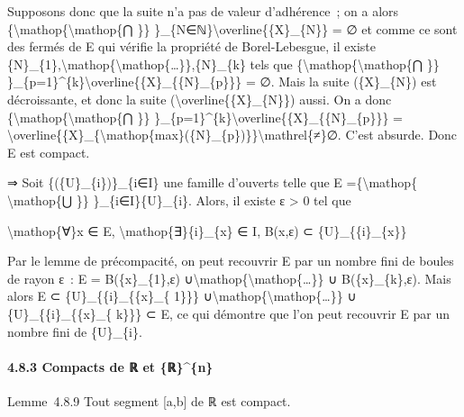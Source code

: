 \documentclass[]{article}
\begin{document}
Supposons donc que la suite n'a pas de valeur d'adhérence~; on a alors
\{\textbackslash{}mathop\{\textbackslash{}mathop\{⋂ \}\}
\}\_\{N∈ℕ\}\textbackslash{}overline\{\{X\}\_\{N\}\} = ∅ et comme ce sont
des fermés de E qui vérifie la propriété de Borel-Lebesgue, il existe
\{N\}\_\{1\},\textbackslash{}mathop\{\textbackslash{}mathop\{\ldots{}\}\},\{N\}\_\{k\}
tels que \{\textbackslash{}mathop\{\textbackslash{}mathop\{⋂ \}\}
\}\_\{p=1\}\^{}\{k\}\textbackslash{}overline\{\{X\}\_\{\{N\}\_\{p\}\}\}
= ∅. Mais la suite (\{X\}\_\{N\}) est décroissante, et donc la suite
(\textbackslash{}overline\{\{X\}\_\{N\}\}) aussi. On a donc
\{\textbackslash{}mathop\{\textbackslash{}mathop\{⋂ \}\}
\}\_\{p=1\}\^{}\{k\}\textbackslash{}overline\{\{X\}\_\{\{N\}\_\{p\}\}\}
=
\textbackslash{}overline\{\{X\}\_\{\textbackslash{}mathop\{max\}(\{N\}\_\{p\})\}\}\textbackslash{}mathrel\{≠\}∅.
C'est absurde. Donc E est compact.

⇒ Soit \{(\{U\}\_\{i\})\}\_\{i∈I\} une famille d'ouverts telle que E
=\{\textbackslash{}mathop\{ \textbackslash{}mathop\{⋃ \}\}
\}\_\{i∈I\}\{U\}\_\{i\}. Alors, il existe ε \textgreater{} 0 tel que

\textbackslash{}mathop\{∀\}x ∈ E,
\textbackslash{}mathop\{∃\}\{i\}\_\{x\} ∈ I, B(x,ε) ⊂
\{U\}\_\{\{i\}\_\{x\}\}

Par le lemme de précompacité, on peut recouvrir E par un nombre fini de
boules de rayon ε~: E = B(\{x\}\_\{1\},ε)
∪\textbackslash{}mathop\{\textbackslash{}mathop\{\ldots{}\}\} ∪
B(\{x\}\_\{k\},ε). Mais alors E ⊂ \{U\}\_\{\{i\}\_\{\{x\}\_\{ 1\}\}\}
∪\textbackslash{}mathop\{\textbackslash{}mathop\{\ldots{}\}\} ∪
\{U\}\_\{\{i\}\_\{\{x\}\_\{ k\}\}\} ⊂ E, ce qui démontre que l'on peut
recouvrir E par un nombre fini de \{U\}\_\{i\}.

\paragraph{4.8.3 Compacts de ℝ et \{ℝ\}\^{}\{n\}}

Lemme~4.8.9 Tout segment {[}a,b{]} de ℝ est compact.
\end{document}
